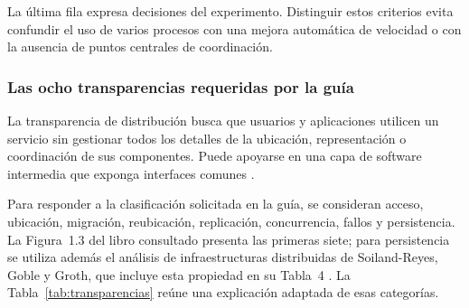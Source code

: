 La última fila expresa decisiones del experimento. Distinguir estos criterios evita
confundir el uso de varios procesos con una mejora automática de velocidad o con la
ausencia de puntos centrales de coordinación.

\subsubsection{Las ocho transparencias requeridas por la guía}

La transparencia de distribución busca que usuarios y aplicaciones utilicen un
servicio sin gestionar todos los detalles de la ubicación, representación o
coordinación de sus componentes. Puede apoyarse en una capa de software intermedia
que exponga interfaces comunes \cite[pp.~11--13]{belinda_vansteen2023_distributed}.

Para responder a la clasificación solicitada en la guía, se consideran acceso,
ubicación, migración, reubicación, replicación, concurrencia, fallos y persistencia.
La Figura~1.3 del libro consultado presenta las primeras siete; para persistencia
se utiliza además el análisis de infraestructuras distribuidas de Soiland-Reyes,
Goble y Groth, que incluye esta propiedad en su Tabla~4
\cite[pp.~12--13]{belinda_vansteen2023_distributed}
\cite[tabla~4, pp.~16--17]{belinda_soiland2024_transparency}.
La Tabla~\ref{tab:transparencias} reúne una explicación adaptada de esas categorías.

